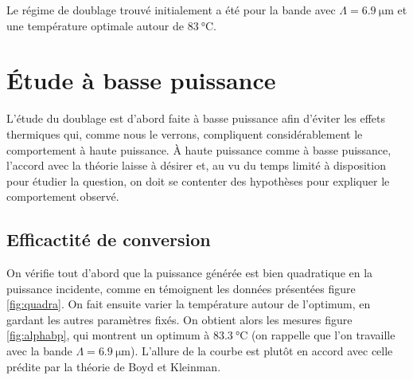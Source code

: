 \documentclass[11pt,a4paper] { article}
\begin{document}



Le régime de doublage trouvé initialement a été pour la bande avec $\Lambda = \SI{6.9}{\micro\meter}$ et une température optimale autour de $\SI{83}{\celsius}$.

\section{Étude à basse puissance}

L'étude du doublage est d'abord faite à basse puissance afin d'éviter les effets thermiques qui, comme nous le verrons, compliquent considérablement le comportement à haute puissance. À haute puissance comme à basse puissance, l'accord avec la théorie laisse à désirer et, au vu du temps limité à disposition pour étudier la question, on doit se contenter des hypothèses pour expliquer le comportement observé.

\subsection{Efficactité de conversion}

On vérifie tout d'abord que la puissance générée est bien quadratique en la puissance incidente, comme en témoignent les données présentées figure \ref{fig:quadra}. On fait ensuite varier la température autour de l'optimum, en gardant les autres paramètres fixés. On obtient alors les mesures figure \ref{fig:alphabp}, qui montrent un optimum à $\SI{83.3}{\celsius}$ (on rappelle que l'on travaille avec la bande $\Lambda = \SI{6.9}{\micro\meter}$). L'allure de la courbe est plutôt en accord avec celle prédite par la théorie de Boyd et Kleinman. 
\end{document}
